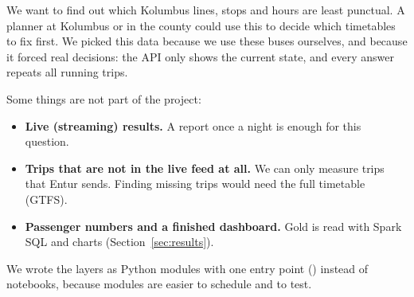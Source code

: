 We want to find out which Kolumbus lines, stops and hours are least punctual. A planner at
Kolumbus or in the county could use this to decide which timetables to fix first. We picked
this data because we use these buses ourselves, and because it forced real decisions: the API
only shows the current state, and every answer repeats all running trips.

Some things are not part of the project:
\begin{itemize}
  \item \textbf{Live (streaming) results.} A report once a night is enough for this question.
  \item \textbf{Trips that are not in the live feed at all.} We can only measure trips that
        Entur sends. Finding missing trips would need the full timetable (GTFS).
  \item \textbf{Passenger numbers and a finished dashboard.} Gold is read with Spark SQL and
        charts (Section~\ref{sec:results}).
\end{itemize}

We wrote the layers as Python modules with one entry point ()
instead of notebooks, because modules are easier to schedule and to test.
